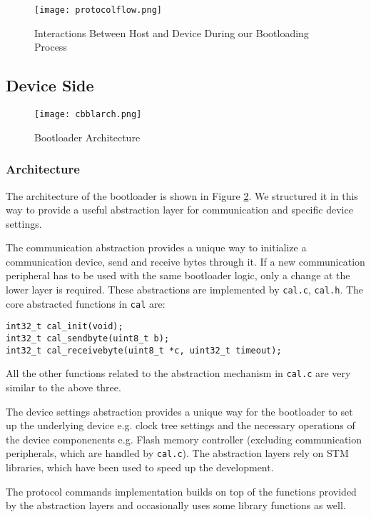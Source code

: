 \documentclass[11pt]{article} %
\begin{document}
\begin{figure}[htbp]
\begin{center}
\texttt{[image: protocolflow.png]}
\end{center}
\caption{Interactions Between Host and Device During our Bootloading Process}
\label{protocolflow}
\end{figure}

\subsection{Device Side}

\begin{figure}[htbp]
\begin{center}
\texttt{[image: cbblarch.png]}
\end{center}
\caption{Bootloader Architecture}
\label{cbblarch}
\end{figure}

\subsubsection{Architecture}
The architecture of the bootloader is shown in Figure  \ref{cbblarch}. We structured it in this way to provide a useful abstraction layer for communication and specific device settings.

The communication abstraction provides a unique way to initialize a communication device, send and receive bytes through it. If a new communication peripheral has to be used with the same bootloader logic, only a change at the lower layer is required. These abstractions are implemented by \texttt{cal.c}, \texttt{cal.h}. The core abstracted functions in \texttt{cal} are:
\begin{verbatim}
int32_t cal_init(void);
int32_t cal_sendbyte(uint8_t b);
int32_t cal_receivebyte(uint8_t *c, uint32_t timeout);
\end{verbatim}
All the other functions related to the abstraction mechanism in \texttt{cal.c} are very similar to the above three.

The device settings abstraction provides a unique way for the bootloader to set up the underlying device e.g. clock tree settings and the necessary operations of the device componenents e.g. Flash memory controller (excluding communication peripherals, which are handled by \texttt{cal.c}).
The abstraction layers rely on STM libraries, which have been used to speed up the development.

The protocol commands implementation builds on top of the functions provided by the abstraction layers and occasionally uses some library functions as well. 
\end{document}
